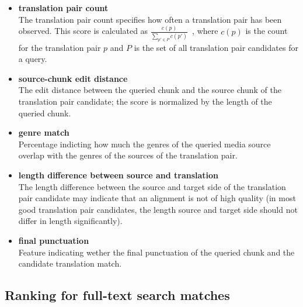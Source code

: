 \begin{itemize}
	\item \textbf{translation pair count}\\%
	The translation pair count specifies how often a translation pair has been observed. This score is calculated as $\frac{c(p)}{ \sum_{p' \in P}{c(p')}  } $\ , where $c(p)$ is the count for the translation pair $p$ and $P$ is the set of all translation pair candidates for a query.
	
	\item \textbf{source-chunk edit distance}\\
	The edit distance between the queried chunk and the source chunk of the translation pair candidate; the score is normalized by the length of the queried chunk.
	
	\item \textbf{genre match}\\
	Percentage indicting how much the genres of the queried media source overlap with the genres of the sources of the translation pair.

	\item \textbf{length difference between source and translation}\\
	The length difference between the source and target side of the translation pair candidate may indicate that an alignment is not of high quality (in most good translation pair candidates,  the length source and target side should not differ in length significantly).
	
	\item \textbf{final punctuation}\\
	Feature indicating wether the final punctuation of the queried chunk and the candidate translation match.
	
	
	
\end{itemize}



\subsection{Ranking for full-text search matches}



